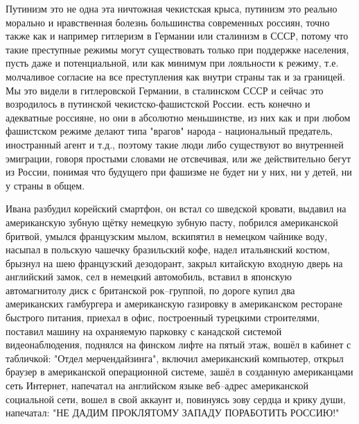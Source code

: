  
 
 
 
 

Путинизм это не одна эта ничтожная чекистская крыса, путинизм это реально
морально и нравственная болезнь большинства современных россиян, точно также
как и например гитлеризм в Германии или сталинизм в СССР, потому что такие
преступные режимы могут существовать только при поддержке населения, пусть даже
и потенциальной, или как минимум при лояльности к режиму, т.е. молчаливое
согласие на все преступления как внутри страны так и за границей. Мы это видели
в гитлеровской Германии, в сталинском СССР и сейчас это возродилось в путинской
чекистско-фашистской России. есть конечно и адекватные россияне, но они в
абсолютно меньшинстве, из них как и при любом фашистском режиме делают типа
"врагов" народа - национальный предатель, иностранный агент и т.д., поэтому
такие люди либо существуют во внутренней эмиграции, говоря простыми словами не
отсвечивая, или же действительно бегут из России, понимая что будущего при
фашизме не будет ни у них, ни у детей, ни у страны в общем.

Ивана разбудил корейский смартфон, он встал со шведской кровати, выдавил на
американскую зубную щётку немецкую зубную пасту, побрился американской бритвой,
умылся французским мылом, вскипятил в немецком чайнике воду, насыпал в польскую
чашечку бразильский кофе, надел итальянский костюм, брызнул на шею французский
дезодорант, закрыл китайскую входную дверь на английский замок, сел в немецкий
автомобиль, вставил в японскую автомагнитолу диск с британской рок–группой, по
дороге купил два американских гамбургера и американскую газировку в
американском ресторане быстрого питания, приехал в офис, построенный турецкими
строителями, поставил машину на охраняемую парковку с канадской системой
видеонаблюдения, поднялся на финском лифте на пятый этаж, вошёл в кабинет с
табличкой: "Отдел мерчендайзинга", включил американский компьютер, открыл
браузер в американской операционной системе, зашёл в созданную американцами
сеть Интернет, напечатал на английском языке веб–адрес американской социальной
сети, вошел в свой аккаунт и, повинуясь зову сердца и крику души, напечатал:
"НЕ ДАДИМ ПРОКЛЯТОМУ ЗАПАДУ ПОРАБОТИТЬ РОССИЮ!"

